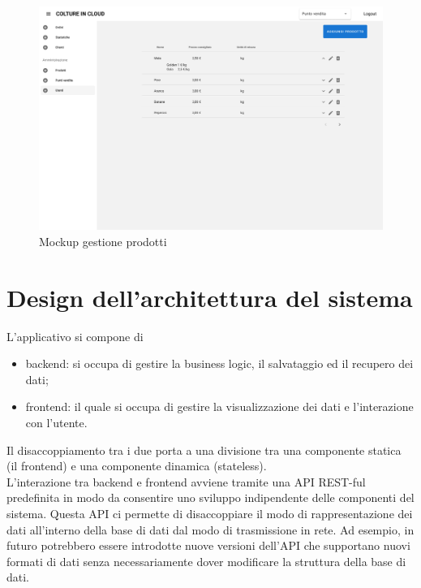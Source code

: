 \documentclass[italian]{report}
\begin{document}
\begin{figure}[htp]
    \centering
    \includegraphics[width=\textwidth]{assets/mockup_products.jpg}
    \caption{Mockup gestione prodotti}
    \label{fig:getProducts}
\end{figure}

\section{Design dell'architettura del sistema}
L'applicativo si compone di 
\begin{itemize}
    \item backend: si occupa di gestire la business logic, il salvataggio ed il recupero dei dati;
    \item frontend: il quale si occupa di gestire la visualizzazione dei dati e l'interazione con l'utente.
\end{itemize}
Il disaccoppiamento tra i due porta a una divisione tra una componente statica (il frontend) e una componente dinamica (stateless). \\
L'interazione tra backend e frontend avviene tramite una API REST-ful predefinita in modo da consentire uno sviluppo indipendente delle componenti del sistema. Questa API ci permette di disaccoppiare il modo di rappresentazione dei dati all'interno della base di dati dal modo di trasmissione in rete. Ad esempio, in futuro potrebbero essere introdotte nuove versioni dell'API che supportano nuovi formati di dati senza necessariamente dover modificare la struttura della base di dati. 
\end{document}
